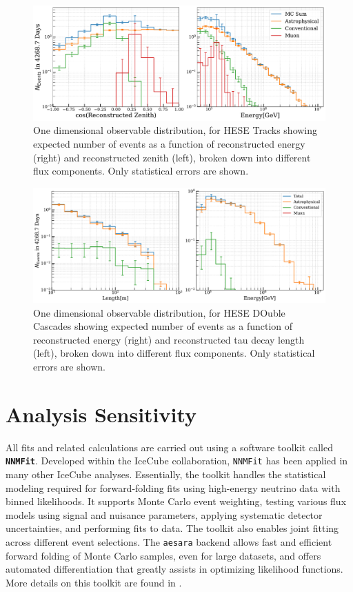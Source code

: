 \begin{figure}[h!]
    \caption{One dimensional observable distribution, for HESE Tracks showing expected number of events as a function of reconstructed energy (right) and reconstructed zenith (left), broken down into different flux components. Only statistical errors are shown.}
    \includegraphics{./figures/Analysis/Tracks.pdf}
\end{figure}

\begin{figure}[h!]
    \caption{One dimensional observable distribution, for HESE DOuble Cascades showing expected number of events as a function of reconstructed energy (right) and reconstructed tau decay length (left), broken down into different flux components. Only statistical errors are shown.}
    \includegraphics{./figures/Analysis/Double.pdf}
\end{figure}

\section{Analysis Sensitivity}
\label{sec:sensitivty}
All fits and related calculations are carried out using a software toolkit called \textbf{\texttt{NNMFit}}. Developed within the IceCube collaboration, \texttt{NNMFit} has been applied in many other IceCube analyses. Essentially, the toolkit handles the statistical modeling required for forward-folding fits using high-energy neutrino data with binned likelihoods. It supports Monte Carlo event weighting, testing various flux models using signal and nuisance parameters, applying systematic detector uncertainties, and performing fits to data. The toolkit also enables joint fitting across different event selections. The \texttt{aesara} backend allows fast and efficient forward folding of Monte Carlo samples, even for large datasets, and offers automated differentiation that greatly assists in optimizing likelihood functions. More details on this toolkit are found in .

